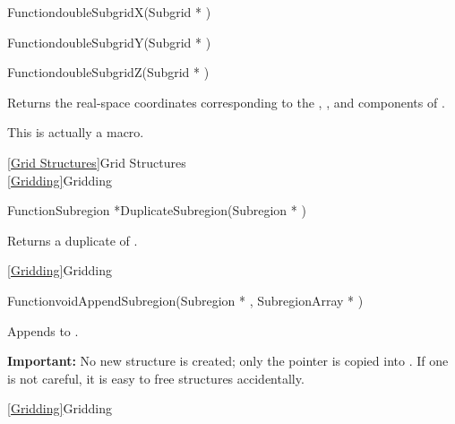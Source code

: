 {\newpage\clearpage
{}%
\begin{deftypefn}{Function}{double}{SubgridX}({Subgrid *} )
\end{deftypefn}%
\lthtmlfigureZ
\lthtmlcheckvsize\clearpage}

{\newpage\clearpage
{}%
\begin{deftypefn}{Function}{double}{SubgridY}({Subgrid *} )
\end{deftypefn}%
\lthtmlfigureZ
\lthtmlcheckvsize\clearpage}

{\newpage\clearpage
{}%
\begin{deftypefn}{Function}{double}{SubgridZ}({Subgrid *} )
\par
\DESCRIPTION
Returns the real-space coordinates corresponding to the
, , and  components of .
\par
\NOTES
This is actually a macro.
\par
\SEEALSO
\vref{Grid Structures}{Grid Structures}\\
\vref{Gridding}{Gridding}
\par
\end{deftypefn}%
\lthtmlfigureZ
\lthtmlcheckvsize\clearpage}

{\newpage\clearpage
{}%
\begin{deftypefn}{Function}{Subregion *}{DuplicateSubregion}({Subregion *} )
\par
\DESCRIPTION
Returns a duplicate of .
\par
\SEEALSO
\vref{Gridding}{Gridding}
\par
\end{deftypefn}%
\lthtmlfigureZ
\lthtmlcheckvsize\clearpage}

{\newpage\clearpage
{}%
\begin{deftypefn}{Function}{void}{AppendSubregion}({Subregion *} , {SubregionArray *} )
\par
\DESCRIPTION
Appends  to .
\par
\NOTES
{\bf Important:}
No new  structure is created; only the pointer
is copied into .
If one is not careful, it is easy to free  structures
accidentally.
\par
\SEEALSO
\vref{Gridding}{Gridding}
\par
\end{deftypefn}%
\lthtmlfigureZ
\lthtmlcheckvsize\clearpage}

